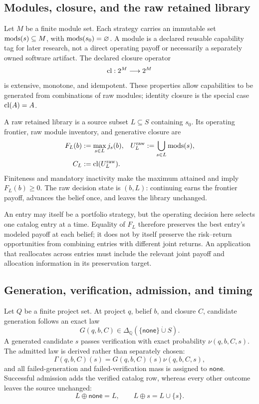 \subsection{Modules, closure, and the raw retained library}

Let \(M\) be a finite module set.  Each strategy carries an immutable set
\(\operatorname{mods}(s)\subseteq M\), with \(\operatorname{mods}(s_0)=\varnothing\).  A module is a
declared reusable capability tag for later research, not a direct operating
payoff or necessarily a separately owned software artifact.  The
declared closure operator
\[
  \operatorname{cl}:2^M\longrightarrow 2^M
\]
is extensive, monotone, and idempotent.  These properties allow capabilities
to be generated from combinations of raw modules; identity closure is the
special case \(\operatorname{cl}(A)=A\).

A raw retained library is a source subset \(L\subseteq S\) containing
\(s_0\).  Its operating frontier, raw module inventory, and generative closure
are
\begin{align}
  F_L(b)&:=\max_{s\in L}j_s(b),
  &U_L^{\mathrm{raw}}&:=\bigcup_{s\in L}\operatorname{mods}(s),
  \label{eq:frontier-union}\\
  C_L&:=\operatorname{cl}(U_L^{\mathrm{raw}}).
  \label{eq:raw-library-closure}
\end{align}
Finiteness and mandatory inactivity make the maximum attained and imply
\(F_L(b)\geq0\).  The raw decision state is \((b,L)\): continuing earns the
frontier payoff, advances the belief once, and leaves the library unchanged.

An entry may itself be a portfolio strategy, but the operating decision here
selects one catalog entry at a time. Equality of \(F_L\) therefore preserves
the best entry's modeled payoff at each belief; it does not by itself preserve
the risk--return opportunities from combining entries with different joint
returns. An application that reallocates across entries must include the
relevant joint payoff and allocation information in its preservation target.

\subsection{Generation, verification, admission, and timing}

Let \(Q\) be a finite project set.  At project \(q\), belief \(b\), and
closure \(C\), candidate generation follows an exact law
\[
  G(q,b,C)\in\Delta_{\mathbb Q}(\{\mathsf{none}\}\mathbin{\dot\cup}S).
\]
A generated candidate \(s\) passes verification with exact probability
\(\nu(q,b,C,s)\).  The admitted law is derived rather than separately chosen:
\begin{equation}
  \Gamma(q,b,C)(s)=G(q,b,C)(s)\nu(q,b,C,s),
  \label{eq:admitted-law-main}
\end{equation}
and all failed-generation and failed-verification mass is assigned to
\(\mathsf{none}\).  Successful admission adds the verified catalog row,
whereas every other outcome leaves the source unchanged:
\begin{equation}
  L\oplus\mathsf{none}=L,
  \qquad L\oplus s=L\cup\{s\}.
  \label{eq:raw-library-update}
\end{equation}

